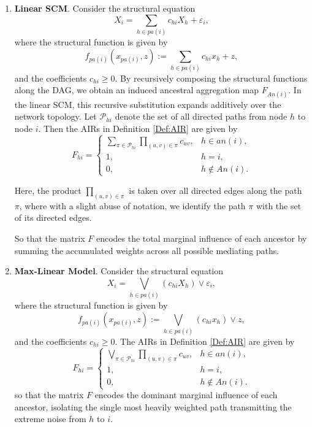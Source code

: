 \documentclass[10pt]{article}
\begin{document}
\begin{enumerate}


\item \textbf{Linear SCM}.
Consider the structural equation
\[
    X_i = \sum_{h \in {pa}(i)} c_{hi} X_h + \varepsilon_i,
\]
where the structural function is given by
\[
    f_{{pa}(i)}(x_{{pa}(i)}, z) := \sum_{h \in {pa}(i)} c_{hi} x_h + z,
\]
 and the coefficients $c_{hi} \ge 0$.
 By recursively composing the structural functions along the DAG, we obtain an induced ancestral aggregation map $F_{{An}(i)}$. 
 In the linear SCM, this recursive substitution expands additively over the network topology. 
Let $\mathcal{P}_{hi}$ denote the set of all directed paths from node $h$ to node $i$. Then the AIRs in Definition \ref{Def:AIR} are given by
\begin{equation}\label{eq:linear SCM AIR}
    F_{hi} = 
    \begin{cases} 
        \sum_{\pi \in \mathcal{P}_{hi}} \prod_{(u, v) \in \pi} c_{uv}, & h \in {an}(i), \\[4pt]
        1, & h = i, \\[4pt]
        0, & h \notin {An}(i).
    \end{cases}
\end{equation}

Here, the product $\prod_{(u,v)\in \pi}$ is taken over all directed edges along the path $\pi$, where with a slight abuse of notation, we identify the path $\pi$ with the set of its directed edges.


 So that the matrix $F$ encodes the total marginal influence of each ancestor by summing the accumulated weights across all possible mediating paths.

\item \textbf{Max-Linear   Model}.
Consider the structural equation
\[
    X_i = \bigvee_{h \in {pa}(i)} (c_{hi} X_h) \vee \varepsilon_i,
\]
where the structural function is given by  
\[
    f_{{pa}(i)}(x_{{pa}(i)}, z) := \bigvee_{h \in {pa}(i)} (c_{hi} x_h) \vee z,
\]
and the coefficients $c_{hi} \ge 0$.
The AIRs in Definition \ref{Def:AIR} are given by
\[
    F_{hi} = \begin{cases} 
        \bigvee_{\pi \in \mathcal{P}_{hi}} \prod_{(u , v) \in \pi} c_{uv}, & h \in {an}(i), \\[4pt]
        1, & h = i, \\[4pt]
        0, & h \notin {An}(i). 
    \end{cases}
\]
 so that the matrix $F$ encodes the dominant marginal influence of each ancestor, isolating the single most heavily weighted path transmitting the extreme noise from $h$ to $i$.



\end{enumerate}
\end{document}
